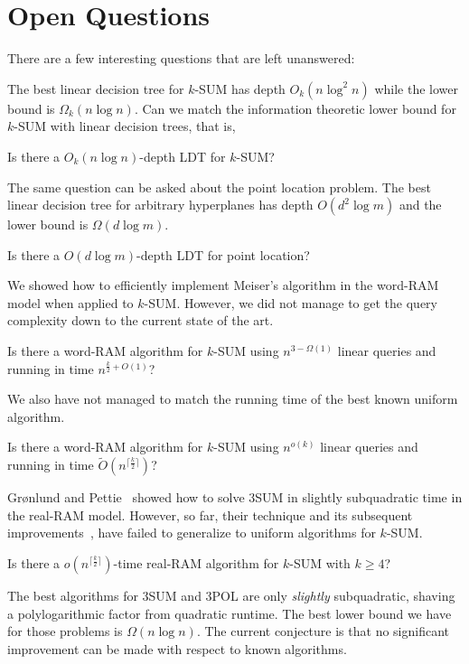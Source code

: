 \chapter{Open Questions}

There are a few interesting questions that are left unanswered:

The best linear decision tree for \(k\)-SUM has depth \(O_k(n \log^2 n)\) while
the lower bound is \(\Omega_k(n \log n)\).
Can we match the information theoretic lower bound for \(k\)-SUM with linear
decision trees, that is,
\begin{openquestion}
Is there a \(O_k(n \log n)\)-depth LDT for \(k\)-SUM?
\end{openquestion}

The same question can be asked about the point location problem. The best
linear decision tree for arbitrary hyperplanes has depth \(O(d^2 \log m)\) and
the lower bound is \(\Omega(d \log m)\).
\begin{openquestion}
Is there a \(O(d \log m)\)-depth LDT for point location?
\end{openquestion}

We showed how to efficiently implement Meiser's algorithm in the word-RAM model
when applied to \(k\)-SUM. However, we did not manage to get the query
complexity down to the current state of the art.
\begin{openquestion}
Is there a word-RAM algorithm for \(k\)-SUM using \(n^{3 - \Omega(1)}\)
linear queries and running in time \(n^{\frac{k}{2}+O(1)}\)?
\end{openquestion}

We also have not managed to match the running time of the best known uniform
algorithm.
\begin{openquestion}
Is there a word-RAM algorithm for \(k\)-SUM using \(n^{o(k)}\) linear queries and
running in time \( \tilde{O}(n^{\lceil \frac k2 \rceil})\)?
\end{openquestion}

Gr\o nlund and Pettie~\cite{GP18}
showed how to solve 3SUM in slightly subquadratic time in the real-RAM model.
However, so far, their technique and its subsequent
improvements~\cite{Fr15,GS15,Ch18}, have failed to generalize to uniform algorithms
for \(k\)-SUM.
\begin{openquestion}
	Is there a \(o(n^{\lceil \frac k2 \rceil})\)-time real-RAM algorithm for
	\(k\)-SUM with \(k \geq 4\)?
\end{openquestion}

The best algorithms for 3SUM and 3POL are only \emph{slightly} subquadratic,
shaving a polylogarithmic factor from quadratic runtime. The best lower bound
we have for those problems is \(\Omega(n \log n)\). The current conjecture is that
no significant improvement can be made with respect to known algorithms.
\ConjectureSUM*


